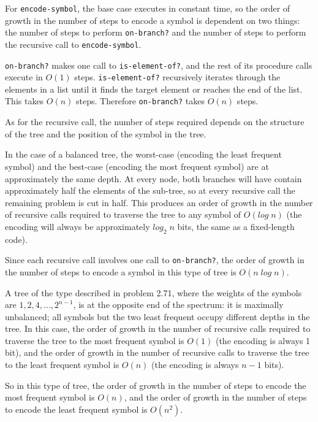 \documentclass{article}
\def\code#1{\texttt{#1}}
\begin{document}
For \code{encode-symbol}, the base case executes in constant time, so the order of growth in the number of steps to encode a symbol is dependent on two things: the number of steps to perform \code{on-branch?} and the number of steps to perform the recursive call to \code{encode-symbol}.

\code{on-branch?} makes one call to \code{is-element-of?}, and the rest of its procedure calls execute in $O(1)$ steps.
\code{is-element-of?} recursively iterates through the elements in a list until it finds the target element or reaches the end of the list. This takes $O(n)$ steps.
Therefore \code{on-branch?} takes $O(n)$ steps.

As for the recursive call, the number of steps required depends on the structure of the tree and the position of the symbol in the tree.

In the case of a balanced tree, the worst-case (encoding the least frequent symbol) and the best-case (encoding the most frequent symbol) are at approximately the same depth. At every node, both branches will have contain approximately half the elements of the sub-tree, so at every recursive call the remaining problem is cut in half. This produces an order of growth in the number of recursive calls required to traverse the tree to any symbol of $O(log\;n)$ (the encoding will always be approximately $log_2\;n$ bits, the same as a fixed-length code).

Since each recursive call involves one call to \code{on-branch?}, the order of growth in the number of steps to encode a symbol in this type of tree is $O(n\;log\;n)$.

A tree of the type described in problem 2.71, where the weights of the symbols are $1, 2, 4, ..., 2^{n-1}$, is at the opposite end of the spectrum: it is maximally unbalanced; all symbols but the two least frequent occupy different depths in the tree. In this case, the order of growth in the number of recursive calls required to traverse the tree to the most frequent symbol is $O(1)$ (the encoding is always 1 bit), and the order of growth in the number of recursive calls to traverse the tree to the least frequent symbol is $O(n)$ (the encoding is always $n-1$ bits).

So in this type of tree, the order of growth in the number of steps to encode the most frequent symbol is $O(n)$, and the order of growth in the number of steps to encode the least frequent symbol is $O(n^2)$.
\end{document}
